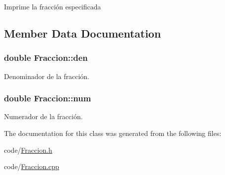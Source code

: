 Imprime la fracción especificada 

\subsection{Member Data Documentation}
\hypertarget{class_fraccion_a7bb085aa596736964bf6444c974a2913}{
\subsubsection[{den}]{\setlength{\rightskip}{0pt plus 5cm}double Fraccion\+::den}}\label{class_fraccion_a7bb085aa596736964bf6444c974a2913}


Denominador de la fracción. 

\hypertarget{class_fraccion_a1c4a5b2bc4a188ba06efbc84a21d72e9}{
\subsubsection[{num}]{\setlength{\rightskip}{0pt plus 5cm}double Fraccion\+::num}}\label{class_fraccion_a1c4a5b2bc4a188ba06efbc84a21d72e9}


Numerador de la fracción. 



The documentation for this class was generated from the following files\+:\begin{DoxyCompactItemize}
\item 
code/\hyperlink{_fraccion_8h}{Fraccion.\+h}\item 
code/\hyperlink{_fraccion_8cpp}{Fraccion.\+cpp}\end{DoxyCompactItemize}
